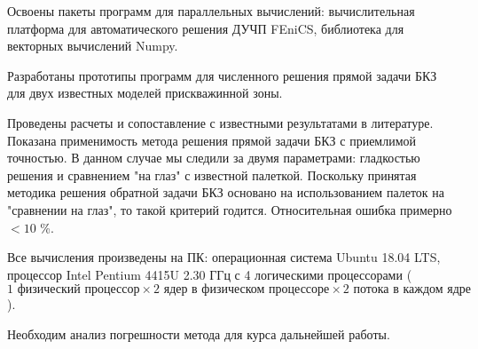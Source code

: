 
Освоены пакеты программ для параллельных вычислений: вычислительная платформа для автоматического решения ДУЧП FEniCS, библиотека для векторных вычислений Numpy.

Разработаны прототипы программ для численного решения прямой задачи БКЗ для двух известных моделей прискважинной зоны.

Проведены расчеты и сопоставление с известными результатами в литературе. Показана применимость метода решения прямой задачи БКЗ с приемлимой точностью. В данном случае мы следили за двумя параметрами: гладкостью решения и сравнением "на глаз" с известной палеткой. Поскольку принятая методика решения обратной задачи БКЗ основано на использованием палеток на "сравнении на глаз", то такой критерий годится. Относительная ошибка примерно ${<10}$ \%.

Все вычисления произведены на ПК: операционная система Ubuntu 18.04 LTS, процессор Intel Pentium 4415U 2.30 ГГц с 4 логическими процессорами
($1 \text{ физический процессор} \times 2 \text{ ядер в физическом процессоре} \times 2 \text{ потока в каждом ядре}$).

Необходим анализ погрешности метода для курса дальнейшей работы.

\clearpage
